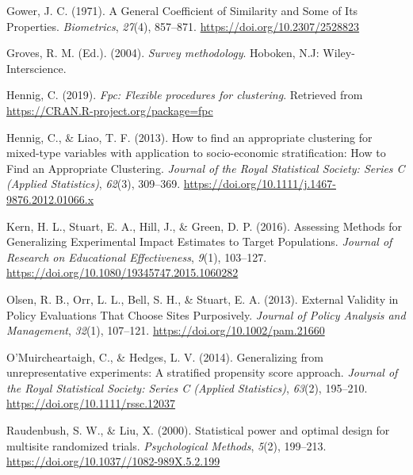 \documentclass[english,man,floatsintext]{apa6}
\begin{document}
\leavevmode\hypertarget{ref-gowerGeneralCoefficientSimilarity1971}{}%
Gower, J. C. (1971). A General Coefficient of Similarity and Some of Its Properties. \emph{Biometrics}, \emph{27}(4), 857--871. \url{https://doi.org/10.2307/2528823}

\leavevmode\hypertarget{ref-grovesSurveyMethodology2004}{}%
Groves, R. M. (Ed.). (2004). \emph{Survey methodology}. Hoboken, N.J: Wiley-Interscience.

\leavevmode\hypertarget{ref-R-fpc}{}%
Hennig, C. (2019). \emph{Fpc: Flexible procedures for clustering}. Retrieved from \url{https://CRAN.R-project.org/package=fpc}

\leavevmode\hypertarget{ref-hennigHowFindAppropriate2013}{}%
Hennig, C., \& Liao, T. F. (2013). How to find an appropriate clustering for mixed-type variables with application to socio-economic stratification: How to Find an Appropriate Clustering. \emph{Journal of the Royal Statistical Society: Series C (Applied Statistics)}, \emph{62}(3), 309--369. \url{https://doi.org/10.1111/j.1467-9876.2012.01066.x}

\leavevmode\hypertarget{ref-kernAssessingMethodsGeneralizing2016}{}%
Kern, H. L., Stuart, E. A., Hill, J., \& Green, D. P. (2016). Assessing Methods for Generalizing Experimental Impact Estimates to Target Populations. \emph{Journal of Research on Educational Effectiveness}, \emph{9}(1), 103--127. \url{https://doi.org/10.1080/19345747.2015.1060282}

\leavevmode\hypertarget{ref-olsenExternalValidityPolicy2013}{}%
Olsen, R. B., Orr, L. L., Bell, S. H., \& Stuart, E. A. (2013). External Validity in Policy Evaluations That Choose Sites Purposively. \emph{Journal of Policy Analysis and Management}, \emph{32}(1), 107--121. \url{https://doi.org/10.1002/pam.21660}

\leavevmode\hypertarget{ref-omuircheartaighGeneralizingUnrepresentativeExperiments2014}{}%
O'Muircheartaigh, C., \& Hedges, L. V. (2014). Generalizing from unrepresentative experiments: A stratified propensity score approach. \emph{Journal of the Royal Statistical Society: Series C (Applied Statistics)}, \emph{63}(2), 195--210. \url{https://doi.org/10.1111/rssc.12037}

\leavevmode\hypertarget{ref-raudenbushStatisticalPowerOptimal2000}{}%
Raudenbush, S. W., \& Liu, X. (2000). Statistical power and optimal design for multisite randomized trials. \emph{Psychological Methods}, \emph{5}(2), 199--213. \url{https://doi.org/10.1037//1082-989X.5.2.199}
\end{document}
